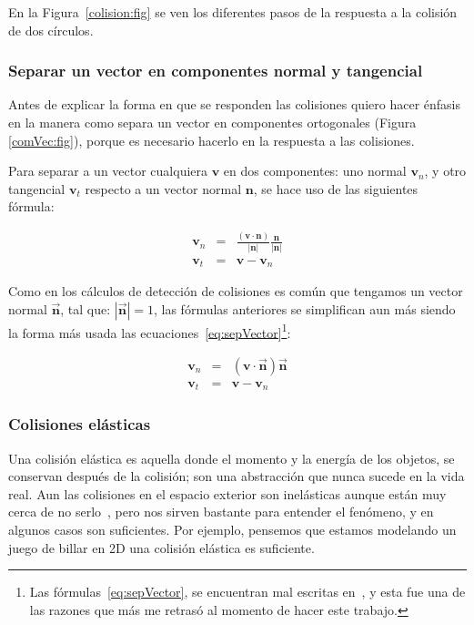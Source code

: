 En la Figura~\ref{colision:fig} se ven los diferentes pasos de la respuesta a la colisión de dos círculos.


\subsubsection{Separar un vector en componentes normal y tangencial}
Antes de explicar la forma en que se responden las colisiones quiero hacer énfasis en la manera como separa un vector en componentes ortogonales (Figura \ref{comVec:fig}), porque es necesario hacerlo en la respuesta a las colisiones.

Para separar a un vector cualquiera $\textbf{v}$ en dos componentes: uno normal $\textbf{v}_n$, y otro tangencial $\textbf{v}_t$ respecto a un vector normal $\textbf{n}$, se hace uso de las siguientes fórmula:

\begin{eqnarray}
\textbf{v}_n & = &\frac{(\textbf{v} \cdot \textbf{n})}{|\textbf{n}|} \frac{\textbf{n}}{|\textbf{n}|} \nonumber \\
\textbf{v}_t & = & \textbf{v} - \textbf{v}_n \nonumber
\end{eqnarray}

Como en los cálculos de detección de colisiones es común que tengamos un vector normal $\vec{\textbf{n}}$, tal que: $|\vec{\textbf{n}}| = 1$, las fórmulas anteriores se simplifican aun más siendo la forma más usada las ecuaciones~\eqref{eq:sepVector}\footnote{Las fórmulas~\eqref{eq:sepVector}, se encuentran mal escritas en~\cite{BaraffWitkin:Coursenotes}, y esta fue una de las razones que más me retrasó al momento de hacer este trabajo.}:

\begin{eqnarray}
\textbf{v}_n & = &(\textbf{v} \cdot \vec{\textbf{n}}) \vec{\textbf{n}} \nonumber \\
\textbf{v}_t & = & \textbf{v} - \textbf{v}_n
\label{eq:sepVector} 
\end{eqnarray}

\subsubsection{Colisiones elásticas}

Una colisión elástica es aquella donde el momento y la energía de los objetos, se conservan después de la colisión; son una abstracción que nunca sucede en la vida real.
Aun las colisiones en el espacio exterior son inelásticas aunque están muy cerca de no serlo~\cite{FisicaMatematicasVideojuegos}, pero nos sirven bastante para entender el fenómeno, y en algunos casos son suficientes.
Por ejemplo, pensemos que estamos modelando un juego de billar en 2D una colisión elástica es suficiente.

